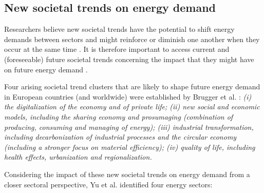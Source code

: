 \subsection{New societal trends on energy demand}


Researchers believe new societal trends have the potential to shift energy demands between sectors and might reinforce or diminish one another when they occur at the same time \cite{2050}. 
It is therefore important to access current and (foreseeable) future societal trends concerning the impact that they might have on future energy demand \cite{2050}. 

Four arising societal trend clusters that are likely to shape future energy demand in European countries (and worldwide) were established by Brugger et al. \cite{2050}:  
\emph{
  (i) the digitalization of the economy and of private life; 
  (ii) new social and economic models, including the sharing economy and prosumaging (combination of producing, consuming and managing of energy); 
  (iii) industrial transformation, including decarbonization of industrial processes and the circular economy (including a stronger focus on material efficiency); 
  (iv) quality of life, including health effects, urbanization and regionalization. 
}


Considering the impact of these new societal trends on energy demand from a closer sectoral perspective,
Yu et al. \cite{newtrends} identified four energy sectors: 

